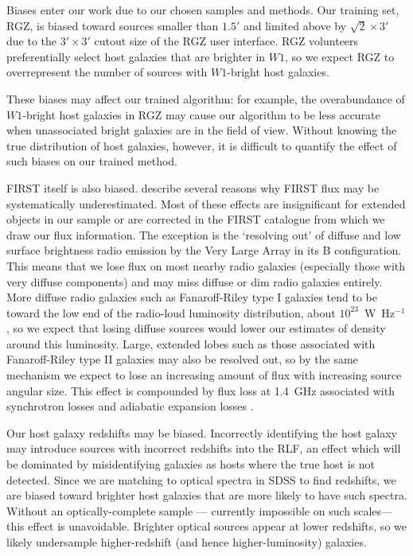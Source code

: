     Biases enter our work due to our chosen samples and methods. Our training set,
    RGZ, is biased toward sources smaller than $1.5'$ and limited above by $\sqrt{2}
    \times 3'$ due to the $3' \times 3'$ cutout size of the RGZ user
    interface. RGZ volunteers preferentially select host
    galaxies that are brighter in $W1$, so we expect RGZ to overrepresent
    the number of sources with $W1$-bright host galaxies.

    These biases may affect our
    trained algorithm: for example, the overabundance of $W1$-bright host
    galaxies in RGZ may cause our algorithm to be less accurate when
    unassociated bright galaxies are in the field of view. Without knowing the true
    distribution of host galaxies, however, it is difficult to quantify the
    effect of such biases on our trained method.

    FIRST itself is also biased. \citet{helfand15first} describe several reasons why FIRST flux may be systematically underestimated. Most of these effects are insignificant for extended objects in our sample or are corrected in the FIRST catalogue from which we draw our flux information. The exception is the `resolving out' of diffuse and low surface brightness radio emission by the Very Large Array in its B configuration. This means that we lose flux on most nearby radio galaxies (especially those with very
    diffuse components) and may miss diffuse or dim radio galaxies entirely.
    More diffuse radio galaxies such as Fanaroff-Riley type I \citep[FRI;][]{fanaroff1974} galaxies tend to
    be toward the low end of the radio-loud luminosity distribution, about
    $10^{23}$~W~Hz$^{-1}$ \citep{best09radio}, so we expect that losing
    diffuse sources would lower our estimates of density around this
    luminosity. Large, extended lobes such as those associated with Fanaroff-Riley type II \citep[FRII;][]{fanaroff1974} galaxies may also be resolved out, so by the same mechanism we expect to lose an increasing amount of flux with increasing source angular size. This effect is compounded by flux loss at 1.4~GHz associated with synchrotron losses and adiabatic expansion losses \citep{blundell99doubles}.

    Our host galaxy redshifts may be biased. Incorrectly identifying the host galaxy may introduce sources with incorrect redshifts into the RLF, an effect which will be dominated by misidentifying galaxies as hosts where the true host is not detected. Since we are matching to optical spectra in SDSS to find
    redshifts, we are biased toward brighter host galaxies that are more
    likely to have such spectra. Without an optically-complete sample ---
    currently impossible on such scales---this effect is unavoidable.
    Brighter optical sources appear at lower redshifts, so we likely
    undersample higher-redshift (and hence higher-luminosity) galaxies.

